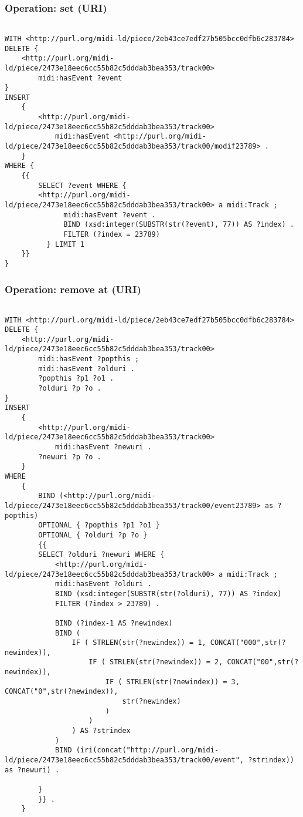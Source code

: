 \subsubsection{Operation: set (URI)}
\label{query:URI:set}

\begin{lstlisting}[language=sparql]

WITH <http://purl.org/midi-ld/piece/2eb43ce7edf27b505bcc0dfb6c283784>
DELETE {
	<http://purl.org/midi-ld/piece/2473e18eec6cc55b82c5dddab3bea353/track00>
		midi:hasEvent ?event
}
INSERT
	{ 
		<http://purl.org/midi-ld/piece/2473e18eec6cc55b82c5dddab3bea353/track00>
			midi:hasEvent <http://purl.org/midi-ld/piece/2473e18eec6cc55b82c5dddab3bea353/track00/modif23789> .
	}
WHERE {
	{{
		SELECT ?event WHERE {
	    <http://purl.org/midi-ld/piece/2473e18eec6cc55b82c5dddab3bea353/track00> a midi:Track ;
	          midi:hasEvent ?event .
		      BIND (xsd:integer(SUBSTR(str(?event), 77)) AS ?index) .
		      FILTER (?index = 23789)
		  } LIMIT 1
	}}
}

\end{lstlisting}

\subsubsection{Operation: remove at (URI)}
\label{query:URI:remove_at}

\begin{lstlisting}[language=sparql]

WITH <http://purl.org/midi-ld/piece/2eb43ce7edf27b505bcc0dfb6c283784>
DELETE {
	<http://purl.org/midi-ld/piece/2473e18eec6cc55b82c5dddab3bea353/track00> 
		midi:hasEvent ?popthis ;
		midi:hasEvent ?olduri .
		?popthis ?p1 ?o1 .
		?olduri ?p ?o .
}
INSERT
	{ 
		<http://purl.org/midi-ld/piece/2473e18eec6cc55b82c5dddab3bea353/track00> 
			midi:hasEvent ?newuri .
		?newuri ?p ?o .
	}
WHERE 
	{ 
		BIND (<http://purl.org/midi-ld/piece/2473e18eec6cc55b82c5dddab3bea353/track00/event23789> as ?popthis)
		OPTIONAL { ?popthis ?p1 ?o1 }
		OPTIONAL { ?olduri ?p ?o }
		{{
		SELECT ?olduri ?newuri WHERE {
			<http://purl.org/midi-ld/piece/2473e18eec6cc55b82c5dddab3bea353/track00> a midi:Track ;
			midi:hasEvent ?olduri .
			BIND (xsd:integer(SUBSTR(str(?olduri), 77)) AS ?index)
			FILTER (?index > 23789) .
			
			BIND (?index-1 AS ?newindex)
			BIND (
				IF ( STRLEN(str(?newindex)) = 1, CONCAT("000",str(?newindex)), 
					IF ( STRLEN(str(?newindex)) = 2, CONCAT("00",str(?newindex)), 
						IF ( STRLEN(str(?newindex)) = 3, CONCAT("0",str(?newindex)), 
							str(?newindex)
						)
					)
				) AS ?strindex
			)
			BIND (iri(concat("http://purl.org/midi-ld/piece/2473e18eec6cc55b82c5dddab3bea353/track00/event", ?strindex)) as ?newuri) .
			
		}	
		}} .
	}


\end{lstlisting}


